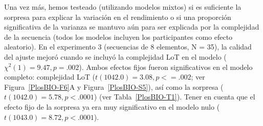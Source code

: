 Una vez más, hemos testeado (utilizando modelos mixtos) si es suficiente la sorpresa para explicar la variación en el rendimiento o si una proporción significativa de la varianza se mantuvo aún para ser explicada por la complejidad de la secuencia (todos los modelos incluyen los participantes como efecto aleatorio). En el experimento 3 (secuencias de 8 elementos, N = 35), la calidad del ajuste mejoró cuando se incluyó la complejidad LoT en el modelo ($\chi^2(1) = 9.47, p= .002$). Ambos efectos fijos fueron significativos en el modelo completo: complejidad LoT ($t (1042.0) = 3.08, p <= .002$; ver Figura~\ref{PlosBIO-F6}A y Figura~\ref{PlosBIO-S5}), así como la sorpresa ($t (1042.0) = 5.78, p < .0001$) (ver Tabla~\ref{PlosBIO-T1}). Tener en cuenta que el efecto fijo de la sorpresa ya era muy significativo en el modelo nulo ($t (1043.0) = 8.72, p < .0001$).


